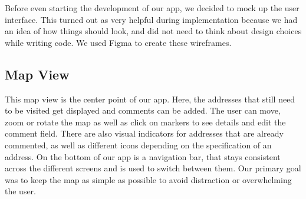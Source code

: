 \Author{\daAuthorTwo}

Before even starting the development of our app, we decided to mock up the user interface. This turned out as very helpful during implementation because we had an idea of how things should look, and did not need to think about design choices while writing code. We used Figma to create these wireframes.

\blankLine

\subsection{Map View}

This map view is the center point of our app. Here, the addresses that still need to be visited get displayed and comments can be added. The user can move, zoom or rotate the map as well as click on markers to see details and edit the comment field. There are also visual indicators for addresses that are already commented, as well as different icons depending on the specification of an address. On the bottom of our app is a navigation bar, that stays consistent across the different screens and is used to switch between them. Our primary goal was to keep the map as simple as possible to avoid distraction or overwhelming the user.

